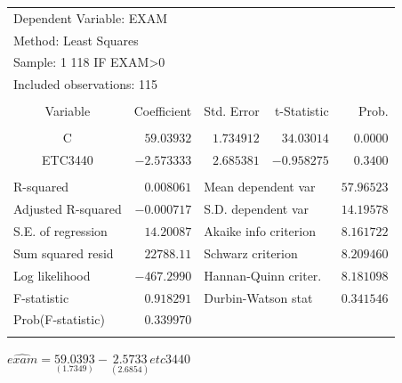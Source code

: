 \documentclass[12pt]{report}
\begin{document}
\begin{table}[H]
	\centering
	\begin{tabular}{lrrrr}
		\multicolumn{3}{l}{Dependent Variable: EXAM}&\multicolumn{1}{c}{}&\multicolumn{1}{c}{}\\
		\multicolumn{3}{l}{Method: Least Squares}&\multicolumn{1}{c}{}&\multicolumn{1}{c}{}\\
		\multicolumn{3}{l}{Sample: 1 118 IF EXAM\textgreater 0}&\multicolumn{1}{c}{}&\multicolumn{1}{c}{}\\
		\multicolumn{3}{l}{Included observations: 115}&\multicolumn{1}{c}{}&\multicolumn{1}{c}{}\\
		[4.5pt] \hline \\ [-4.5pt]
		\multicolumn{1}{c}{Variable}&\multicolumn{1}{r}{Coefficient}&\multicolumn{1}{r}{Std. Error}&\multicolumn{1}{r}{t-Statistic}&\multicolumn{1}{r}{Prob.}\\
		[4.5pt] \hline \\ [-4.5pt]
		\multicolumn{1}{c}{C}&\multicolumn{1}{r}{$59.03932$}&\multicolumn{1}{r}{$1.734912$}&\multicolumn{1}{r}{$34.03014$}&\multicolumn{1}{r}{$0.0000$}\\
		\multicolumn{1}{c}{ETC3440}&\multicolumn{1}{r}{$-2.573333$}&\multicolumn{1}{r}{$2.685381$}&\multicolumn{1}{r}{$-0.958275$}&\multicolumn{1}{r}{$0.3400$}\\
		[4.5pt] \hline \\ [-4.5pt]
		\multicolumn{1}{l}{R-squared}&\multicolumn{1}{r}{$0.008061$}&\multicolumn{2}{l}{Mean dependent var}&\multicolumn{1}{r}{$57.96523$}\\
		\multicolumn{1}{l}{Adjusted R-squared}&\multicolumn{1}{r}{$-0.000717$}&\multicolumn{2}{l}{S.D. dependent var}&\multicolumn{1}{r}{$14.19578$}\\
		\multicolumn{1}{l}{S.E. of regression}&\multicolumn{1}{r}{$14.20087$}&\multicolumn{2}{l}{Akaike info criterion}&\multicolumn{1}{r}{$8.161722$}\\
		\multicolumn{1}{l}{Sum squared resid}&\multicolumn{1}{r}{$22788.11$}&\multicolumn{2}{l}{Schwarz criterion}&\multicolumn{1}{r}{$8.209460$}\\
		\multicolumn{1}{l}{Log likelihood}&\multicolumn{1}{r}{$-467.2990$}&\multicolumn{2}{l}{Hannan-Quinn criter.}&\multicolumn{1}{r}{$8.181098$}\\
		\multicolumn{1}{l}{F-statistic}&\multicolumn{1}{r}{$0.918291$}&\multicolumn{2}{l}{Durbin-Watson stat}&\multicolumn{1}{r}{$0.341546$}\\
		\multicolumn{1}{l}{Prob(F-statistic)}&\multicolumn{1}{r}{$0.339970$}&\multicolumn{1}{c}{}&\multicolumn{1}{c}{}&\multicolumn{1}{c}{}\\
		[4.5pt] \hline \\ [-4.5pt]
	\end{tabular}
\end{table}
\vspace{-\baselineskip} \centering$\widehat{exam} = \underset{(1.7349)}{59.0393} - \underset{(2.6854)}{2.5733}etc3440$
\end{document}
